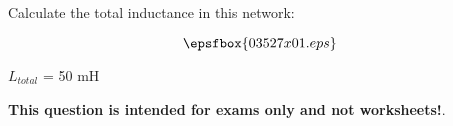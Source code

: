 

Calculate the total inductance in this network:

$$\epsfbox{03527x01.eps}$$







$L_{total}$ = 50 mH







{\bf This question is intended for exams only and not worksheets!}.



